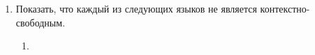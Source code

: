 \documentclass[fleqn]{article}
\begin{document}
\begin{enumerate}

\item Показать, что каждый из следующих языков не является контекстно-свободным.
	\begin{enumerate}
		\item 
	\end{enumerate}

\end{enumerate}
\end{document}
